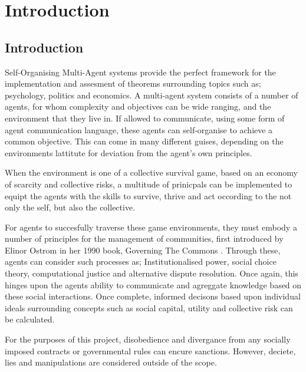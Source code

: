 \chapter{Introduction}\label{introduction}

\section{Introduction}\label{sec:intro}
Self-Organising Multi-Agent systems provide the perfect framework for the implementation and assesment of theorems surrounding topics such as; psychology, politics and economics. A multi-agent system consists of a number of agents, for whom complexity and objectives can be wide ranging, and the environment that they live in. If allowed to communicate, using some form of agent communication language, these agents can self-organise to achieve a common objective. This can come in many different guises, depending on the environments lattitute for deviation from the agent's own principles. 

When the environment is one of a collective survival game, based on an economy of scarcity and collective risks, a multitude of prinicpals can be implemented to equipt the agents with the skills to survive, thrive and act occording to the not only the self, but also the collective. 

For agents to succesfully traverse these game environments, they must embody a number of principles for the management of communities, first introduced by Elinor Ostrom in her 1990 book, Governing The Commons \cite{ostrom2015governing}. Through these, agents can consider such processes as; Institutionalised power, social choice theory, computational justice and alternative dispute resolution. Once again, this hinges upon the agents ability to communicate and agreggate knowledge based on these social interactions. Once complete, informed decisons based upon individual ideals surrounding concepts such as social capital, utility and collective risk can be calculated.

For the purposes of this project, disobedience and divergance from any socially imposed contracts or governmental rules can encure sanctions. However, deciete, lies and manipulations are considered outside of the scope. 


